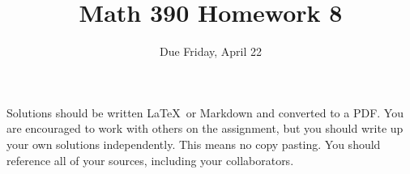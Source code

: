 \documentclass{article}
\title{Math 390 Homework 8}
\author{Due Friday, April 22}
\date{}
\begin{document}

\maketitle

\setlength{\parindent}{0em} %
\setlength{\parskip}{1em} %



Solutions should be written \LaTeX\ or Markdown and converted to a PDF. You are encouraged to work with others
on the assignment, but you should write up your own solutions independently. This means no copy pasting. You should
reference all of your sources, including your collaborators. 
\end{document}
